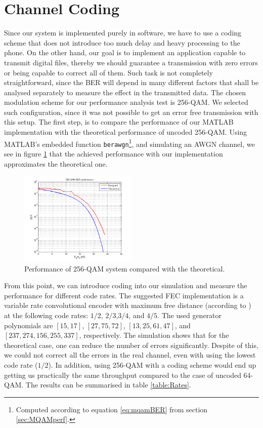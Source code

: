 \documentclass[12pt,a4paper,openright]{report}
\begin{document}
\section{Channel Coding}
\label{sec:ChanCodTests}
Since our system is implemented purely in software, we have to use a coding scheme that does not introduce too much delay and heavy processing to the phone. On the other hand, our goal is to implement an application capable to transmit digital files, thereby we should guarantee a transmission with zero errors or being capable to correct all of them. Such task is not completely straightforward, since the BER will depend in many different factors that shall be analysed separately to measure the effect in the transmitted data. 
The chosen modulation scheme for our performance analysis test is 256-QAM. We selected such configuration, since it was not possible to get an error free transmission with this setup. The first step, is to compare the performance of our MATLAB implementation with the theoretical performance of uncoded 256-QAM. Using MATLAB's embedded function \texttt{berawgn}\footnote{Computed according to equation \ref{eq:mqamBER} from section \ref{sec:MQAMperf}.}, and simulating an AWGN channel, we see in figure \ref{fig:MQAMperf} that the achieved performance with our implementation approximates the theoretical one.


 \begin{figure}[H]
  \centering
    \includegraphics[width=0.5\textwidth]{BERuncoded.png}
    \caption[Performance of 256-QAM system]{Performance of 256-QAM system compared with the theoretical.}
    \label{fig:MQAMperf}
\end{figure}

From this point, we can introduce coding into our simulation and measure the performance for different code rates. The suggested FEC implementation is a variable rate convolutional encoder with maximum free distance (according to \cite{Proakis}) at the following code rates: $1/2$, $2/3$,$3/4$, and $4/5$. The used generator polynomials are $[15,17]$, $[27,75,72]$, $[13,25,61,47]$, and $[237,274,156,255,337]$, respectively. 
The simulation shows that for the theoretical case, one can reduce the number of errors significantly. Despite of this, we could not correct all the errors in the real channel, even with using the lowest code rate ($1/2 $). In addition, using 256-QAM with a coding scheme would end up getting us practically the same throughput compared to the case of uncoded 64-QAM. The results can be summarised in table \ref{table:Rates}.
\end{document}
